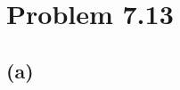 \documentclass{article}
\begin{document}
	\section*{Problem 7.13}
	\subsection*{\quad(a)}
		\begin{center}
			
		\end{center}
\end{document}
